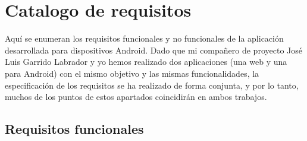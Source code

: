 \section{Catalogo de requisitos}

Aquí se enumeran los requisitos funcionales y no funcionales de la aplicación desarrollada para dispositivos Android. Dado que mi compañero de proyecto José Luis Garrido Labrador y yo hemos realizado dos aplicaciones (una web y una para Android) con el mismo objetivo y las mismas funcionalidades, la especificación de los requisitos  se ha realizado de forma conjunta, y por lo tanto, muchos de los puntos de estos apartados coincidirán en ambos trabajos. 

\subsection{Requisitos funcionales}
 
